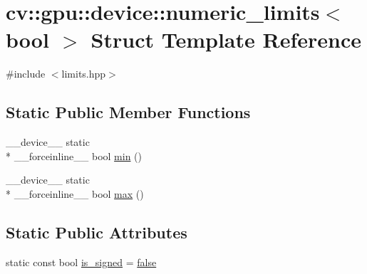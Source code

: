 \hypertarget{structcv_1_1gpu_1_1device_1_1numeric__limits_3_01bool_01_4}{\section{cv\-:\-:gpu\-:\-:device\-:\-:numeric\-\_\-limits$<$ bool $>$ Struct Template Reference}
\label{structcv_1_1gpu_1_1device_1_1numeric__limits_3_01bool_01_4}
}


{\ttfamily \#include $<$limits.\-hpp$>$}

\subsection*{Static Public Member Functions}
\begin{DoxyCompactItemize}
\item 
\-\_\-\-\_\-device\-\_\-\-\_\- static \\*
\-\_\-\-\_\-forceinline\-\_\-\-\_\- bool \hyperlink{structcv_1_1gpu_1_1device_1_1numeric__limits_3_01bool_01_4_a0a208f5ea24f31049b19ede6e374d1c0}{min} ()
\item 
\-\_\-\-\_\-device\-\_\-\-\_\- static \\*
\-\_\-\-\_\-forceinline\-\_\-\-\_\- bool \hyperlink{structcv_1_1gpu_1_1device_1_1numeric__limits_3_01bool_01_4_a1378638a6a758b24a7324646069e91b4}{max} ()
\end{DoxyCompactItemize}
\subsection*{Static Public Attributes}
\begin{DoxyCompactItemize}
\item 
static const bool \hyperlink{structcv_1_1gpu_1_1device_1_1numeric__limits_3_01bool_01_4_a1645e11e2d0b314f3d929c2c2536cd19}{is\-\_\-signed} = \hyperlink{namespacecv_1_1gpu_1_1device_af8d6418be1712e83b4f398e7e7273026}{false}
\end{DoxyCompactItemize}


